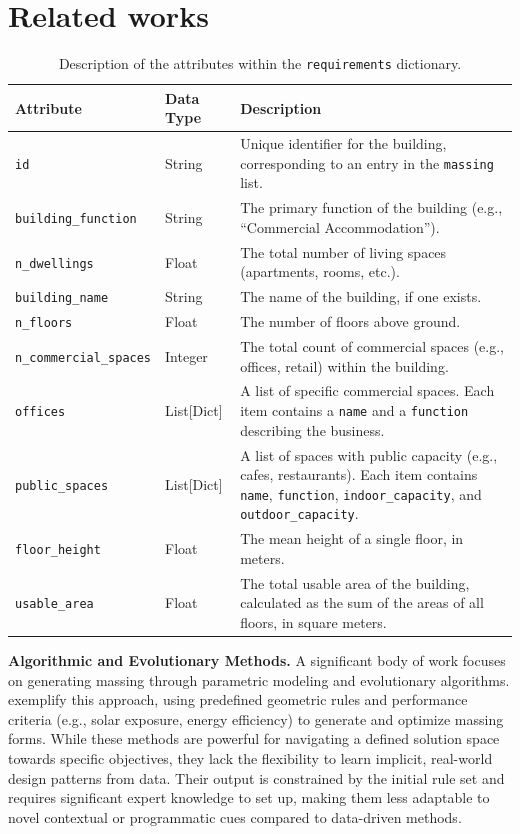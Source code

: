 \section{Related works}
\label{sec:related_works}

\begin{table}[t]
  \caption{Description of the attributes within the \texttt{requirements} dictionary.}
  \label{tab:requirements_schema}
  \centering
  \begin{tabular}{p{4cm} p{2cm} p{10cm}}
      \toprule
      Attribute & Data Type & Description \\
      \midrule
      \texttt{id} & String & Unique identifier for the building, corresponding to an entry in the \texttt{massing} list. \\
      \texttt{building\_function} & String & The primary function of the building (e.g., ``Commercial Accommodation''). \\
      \texttt{n\_dwellings} & Float & The total number of living spaces (apartments, rooms, etc.). \\
      \texttt{building\_name} & String & The name of the building, if one exists. \\
      \texttt{n\_floors} & Float & The number of floors above ground. \\
      \texttt{n\_commercial\_spaces} & Integer & The total count of commercial spaces (e.g., offices, retail) within the building. \\
      \texttt{offices} & List[Dict] & A list of specific commercial spaces. Each item contains a \texttt{name} and a \texttt{function} describing the business. \\
      \texttt{public\_spaces} & List[Dict] & A list of spaces with public capacity (e.g., cafes, restaurants). Each item contains \texttt{name}, \texttt{function}, \texttt{indoor\_capacity}, and \texttt{outdoor\_capacity}. \\
      \texttt{floor\_height} & Float & The mean height of a single floor, in meters. \\
      \texttt{usable\_area} & Float & The total usable area of the building, calculated as the sum of the areas of all floors, in square meters. \\
      \bottomrule
  \end{tabular}
\end{table}

\textbf{Algorithmic and Evolutionary Methods.} A significant body of work focuses on generating massing through parametric modeling and evolutionary algorithms. \cite{1, 2, Gaier_2024} exemplify this approach, using predefined geometric rules and performance criteria (e.g., solar exposure, energy efficiency) to generate and optimize massing forms. While these methods are powerful for navigating a defined solution space towards specific objectives, they lack the flexibility to learn implicit, real-world design patterns from data. Their output is constrained by the initial rule set and requires significant expert knowledge to set up, making them less adaptable to novel contextual or programmatic cues compared to data-driven methods.


